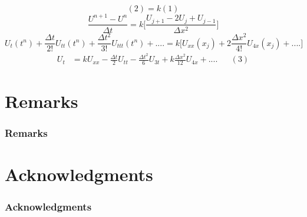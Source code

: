 \documentclass[compress]{beamer}
\begin{document}
\begin{frame}
\[
(2)=k(1)
\]
\[
\frac{U^{n+1}-U^n}{\Delta t}=k\Bigg[\frac{U_{j+1}-2U_j+U_{j-1}}{\Delta x^2}\Bigg]
\]
\[
U_t(t^n)+\frac{\Delta t}{2!}U_{tt}(t^n)+\frac{\Delta t^2}{3!}U_{ttt}(t^n)+....=k\Bigg[U_{xx}(x_j)+2\frac{\Delta x^2}{4!}U_{4x}(x_j)+....\Bigg]
\]
\vspace{.2in}
\begin{align*}
U_t &= kU_{xx}-\frac{\Delta t}{2}U_{tt}-\frac{\Delta t^2}{6}U_{3t}+k\frac{\Delta x^2}{12}U_{4x}+....&&(3)
\end{align*}
\end{frame}

%
%
\section{Remarks}\label{Remarks}

\begin{frame}\frametitle{Remarks}
\end{frame}

%
%
\section{Acknowledgments}\label{Acknowledgments}

\begin{frame}\frametitle{Acknowledgments}
\end{frame}

%
%
\end{document}
